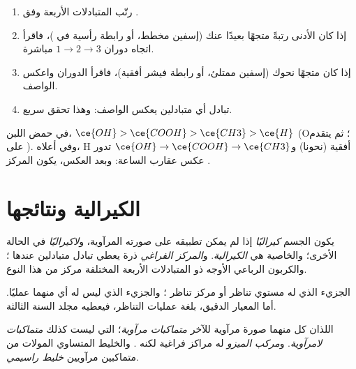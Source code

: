 \begin{method}\label{met:b1:stereochemistry-in-depth:cip}
\begin{enumerate}
  \item رتّب المتبادلات الأربعة وفق .
  \item إذا كان الأدنى رتبةً متجهًا بعيدًا عنك (إسفين مخطط، أو
        رابطة رأسية في )، فاقرأ اتجاه دوران
        $1 \to 2 \to 3$ مباشرة.
  \item إذا كان متجهًا نحوك (إسفين ممتلئ، أو رابطة فيشر أفقية)،
        فاقرأ الدوران واعكس الواصف.
  \item تبادل أي متبادلين يعكس الواصف: وهذا
        تحقق سريع.
\end{enumerate}
في حمض اللبن، $\ce{OH} > \ce{COOH} > \ce{CH3} > \ce{H}$ (O؛ ثم 
يتقدم على ). وفي  أعلاه، H أفقية
(نحونا) و$\ce{OH} \to \ce{COOH} \to \ce{CH3}$ تدور عكس عقارب الساعة:
وبعد العكس، يكون المركز .
\end{method}

\section{الكيرالية ونتائجها}

\begin{definition}\label{def:b1:stereochemistry-in-depth:stereocentre}
يكون الجسم \emph{كيراليًا} إذا لم يمكن تطبيقه على
صورته المرآوية، و\emph{لاكيراليًا} في الحالة الأخرى؛ والخاصية هي
\emph{الكيرالية}. و\emph{المركز
الفراغي} ذرة يعطي تبادل متبادلين عندها
؛ والكربون الرباعي الأوجه ذو المتبادلات الأربعة
المختلفة مركز من هذا النوع.
\end{definition}

الجزيء الذي له مستوي تناظر أو مركز تناظر ؛
والجزيء الذي ليس له أي منهما  عمليًا. أما المعيار الدقيق، بلغة
عمليات التناظر، فيعطيه مجلد السنة الثالثة.

\begin{definition}\label{def:b1:stereochemistry-in-depth:enantiomers}
 اللذان كل منهما صورة مرآوية للآخر
\emph{متماكبات مرآوية}؛  التي ليست كذلك
\emph{متماكبات لامرآوية}. و\emph{مركب
الميزو} له مراكز فراغية لكنه .
والخليط المتساوي المولات من متماكبين مرآويين \emph{خليط
راسيمي}.
\end{definition}

